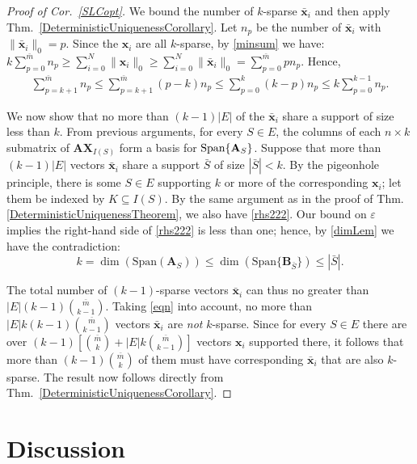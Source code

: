 \documentclass[9pt,twocolumn]{pnas-new}
\begin{document}
\begin{proof}[Proof of Cor.~\ref{SLCopt}]
We bound the number of $k$-sparse $\mathbf{\bar x}_i$ and then apply Thm.~\ref{DeterministicUniquenessCorollary}. 
Let $n_p$ be the number of $\mathbf{\bar x}_i$ with $\|\mathbf{\bar x}_i\|_0 = p$.
Since the $\mathbf{x}_i$ are all $k$-sparse, by \eqref{minsum} we have:
\mbox{$k \sum_{p = 0}^{\bar m} n_p \geq \sum_{i=0}^N \|\mathbf{x}_i\|_0 \geq \sum_{i=0}^N \|\mathbf{\bar x}_i\|_0 = \sum_{p=0}^{\bar m} p n_p.$}
Hence,
\begin{align}\label{eqn}
\sum_{p = k+1}^{\bar m} n_p \leq \sum_{p = k+1}^{\bar m} (p-k) n_p \leq \sum_{p = 0}^k (k-p)n_p \leq k \sum_{p = 0}^{k-1} n_p.
\end{align}

We now show that no more than $(k-1)|E|$ of the $\mathbf{\bar x}_i$ share a support of size less than $k$. 
From previous arguments, for every $S \in E$, the columns of each $n \times k$ submatrix of $\mathbf{AX}_{I(S)}$ form a basis for $\text{\rm Span}\{\mathbf{A}_S\}$.
Suppose that more than $(k-1)|E|$ vectors $\mathbf{\bar x}_i$ share a support $\bar S$ of size $|\bar{S}| < k$. By the pigeonhole principle, there is some $S \in E$ supporting $k$ or more of the corresponding $\mathbf{x}_i$; let them be indexed by $K \subseteq I(S)$.  By the same argument as in the proof of Thm.\ref{DeterministicUniquenessTheorem}, we also have \eqref{rhs222}. Our bound on $\varepsilon$ implies the right-hand side of \eqref{rhs222} is less than one; hence, by \eqref{dimLem} we have the contradiction: 
\[k = \dim(\text{Span}(\mathbf{A}_S)) \leq \dim(\text{Span}\{\mathbf{B}_{\bar S}\}) \leq |\bar S|.\]

The total number of $(k-1)$-sparse vectors $\mathbf{\bar x}_i$ can thus no greater than $|E|(k-1){ \bar m \choose k-1}$. Taking \eqref{eqn} into account, no more than $|E|k(k-1){ \bar m \choose k-1}$ vectors $\mathbf{\bar x}_i$ are \emph{not} $k$-sparse. Since for every $S \in E$ there are over $(k-1)\left[ {\bar m \choose k} + |E|k{ \bar m \choose k-1} \right]$ vectors $\mathbf{x}_i$ supported there, it follows that more than $(k-1){\bar m \choose k}$ of them must have corresponding $\mathbf{\bar x}_i$ that are also $k$-sparse. The result now follows directly from Thm.~\ref{DeterministicUniquenessCorollary}.
\end{proof}

\section{Discussion}\label{Discussion}
\end{document}

